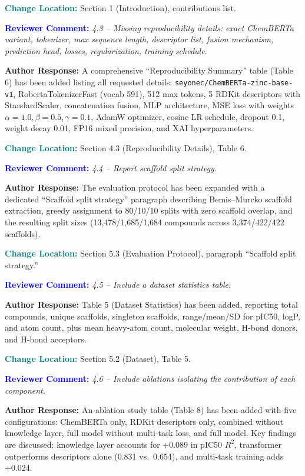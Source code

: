 \documentclass[12pt]{article}
\newcommand{\RC}[1]{\textbf{\textcolor{blue}{Reviewer Comment:}} \textit{#1}\vspace{0.3em}}
\newcommand{\AR}[1]{\textbf{Author Response:} #1\vspace{0.8em}}
\newcommand{\CH}[1]{\textbf{\textcolor{teal}{Change Location:}} #1\vspace{0.5em}}
\begin{document}
\CH{Section 1 (Introduction), contributions list.}

\bigskip

\RC{4.3 -- Missing reproducibility details: exact ChemBERTa variant, tokenizer, max sequence length, descriptor list, fusion mechanism, prediction head, losses, regularization, training schedule.}

\AR{A comprehensive ``Reproducibility Summary'' table (Table 6) has been added listing all requested details: \texttt{seyonec/ChemBERTa-zinc-base-v1}, RobertaTokenizerFast (vocab 591), 512 max tokens, 5 RDKit descriptors with StandardScaler, concatenation fusion, MLP architecture, MSE loss with weights $\alpha=1.0, \beta=0.5, \gamma=0.1$, AdamW optimizer, cosine LR schedule, dropout 0.1, weight decay 0.01, FP16 mixed precision, and XAI hyperparameters.}

\CH{Section 4.3 (Reproducibility Details), Table 6.}

\bigskip

\RC{4.4 -- Report scaffold split strategy.}

\AR{The evaluation protocol has been expanded with a dedicated ``Scaffold split strategy'' paragraph describing Bemis--Murcko scaffold extraction, greedy assignment to 80/10/10 splits with zero scaffold overlap, and the resulting split sizes (13,478/1,685/1,684 compounds across 3,374/422/422 scaffolds).}

\CH{Section 5.3 (Evaluation Protocol), paragraph ``Scaffold split strategy.''}

\bigskip

\RC{4.5 -- Include a dataset statistics table.}

\AR{Table 5 (Dataset Statistics) has been added, reporting total compounds, unique scaffolds, singleton scaffolds, range/mean/SD for pIC50, logP, and atom count, plus mean heavy-atom count, molecular weight, H-bond donors, and H-bond acceptors.}

\CH{Section 5.2 (Dataset), Table 5.}

\bigskip

\RC{4.6 -- Include ablations isolating the contribution of each component.}

\AR{An ablation study table (Table 8) has been added with five configurations: ChemBERTa only, RDKit descriptors only, combined without knowledge layer, full model without multi-task loss, and full model. Key findings are discussed: knowledge layer accounts for +0.089 in pIC50 $R^2$, transformer outperforms descriptors alone (0.831 vs.\ 0.654), and multi-task training adds +0.024.}
\end{document}
